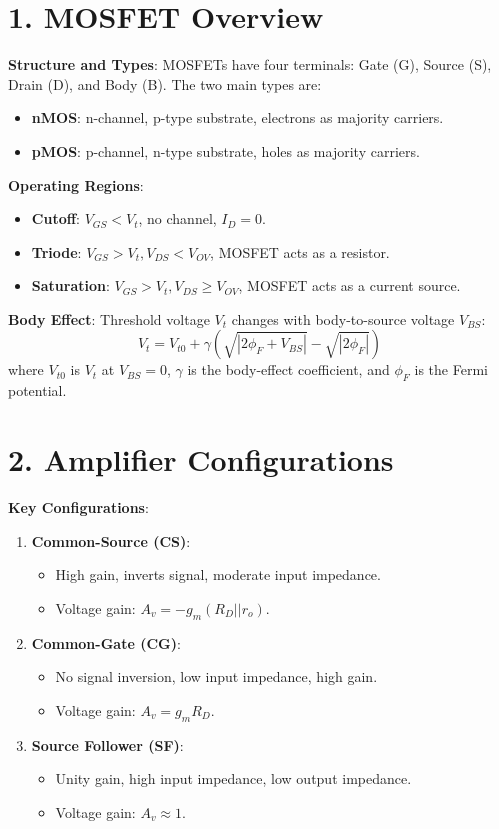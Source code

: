 \documentclass[10pt]{article}
\begin{document}
\small

\begin{multicols}{2}
\section*{1. MOSFET Overview}
\textbf{Structure and Types}: MOSFETs have four terminals: Gate (G), Source (S), Drain (D), and Body (B). The two main types are:
\begin{itemize}[noitemsep]
    \item \textbf{nMOS}: n-channel, p-type substrate, electrons as majority carriers.
    \item \textbf{pMOS}: p-channel, n-type substrate, holes as majority carriers.
\end{itemize}
\textbf{Operating Regions}:
\begin{itemize}[noitemsep]
    \item \textbf{Cutoff}: \(V_{GS} < V_t\), no channel, \(I_D = 0\).
    \item \textbf{Triode}: \(V_{GS} > V_t, V_{DS} < V_{OV}\), MOSFET acts as a resistor.
    \item \textbf{Saturation}: \(V_{GS} > V_t, V_{DS} \geq V_{OV}\), MOSFET acts as a current source.
\end{itemize}
\textbf{Body Effect}: Threshold voltage \(V_t\) changes with body-to-source voltage \(V_{BS}\):
\[
V_t = V_{t0} + \gamma (\sqrt{|2\phi_F + V_{BS}|} - \sqrt{|2\phi_F|})
\]
where \(V_{t0}\) is \(V_t\) at \(V_{BS}=0\), \(\gamma\) is the body-effect coefficient, and \(\phi_F\) is the Fermi potential.

\section*{2. Amplifier Configurations}
\textbf{Key Configurations}:
\begin{enumerate}[noitemsep]
    \item \textbf{Common-Source (CS)}:
        \begin{itemize}[noitemsep]
            \item High gain, inverts signal, moderate input impedance.
            \item Voltage gain: \(A_v = -g_m (R_D || r_o)\).
        \end{itemize}
    \item \textbf{Common-Gate (CG)}:
        \begin{itemize}[noitemsep]
            \item No signal inversion, low input impedance, high gain.
            \item Voltage gain: \(A_v = g_m R_D\).
        \end{itemize}
    \item \textbf{Source Follower (SF)}:
        \begin{itemize}[noitemsep]
            \item Unity gain, high input impedance, low output impedance.
            \item Voltage gain: \(A_v \approx 1\).
        \end{itemize}
\end{enumerate}


\end{multicols}
\end{document}
